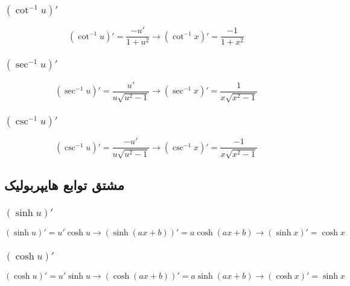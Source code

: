 \subsubsection{$(\cot^{-1} u)'$}
\[ (\cot^{-1} u)' = \frac{-u'}{1+u^2} \to (\cot^{-1}x)' = \frac{-1}{1+x^2} \]

\subsubsection{$(\sec^{-1}u)'$}
\[ (\sec^{-1}u)' = \frac{u'}{u\sqrt{u^2-1}} \to (\sec^{-1}x)' = \frac{1}{x\sqrt{x^2-1}} \]

\subsubsection{$(\csc^{-1}u)'$}
\[ (\csc^{-1}u)' = \frac{-u'}{u\sqrt{u^2-1}} \to (\csc^{-1}x)' = \frac{-1}{x\sqrt{x^2-1}} \]


\subsection{مشتق توابع هایپربولیک}
\subsubsection{$(\sinh u)'$}
\[ (\sinh u)' = u'\cosh u \to (\sinh(ax+b))' = a\cosh(ax+b) \to (\sinh x)' = \cosh x \]

\subsubsection{$(\cosh u)'$}
\[ (\cosh u)' = u'\sinh u \to (\cosh(ax+b))' = a\sinh(ax+b) \to (\cosh x)' = \sinh x \]

